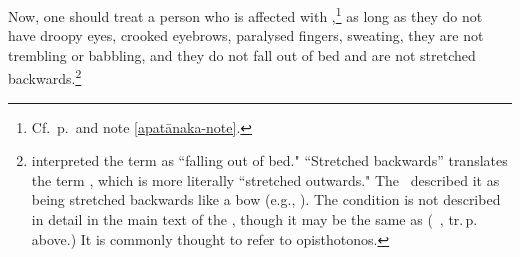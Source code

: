 \begin{translation}
Now, one should treat a person who is affected with
,\footnote{Cf.\ p.\,\pageref{apatānaka} and note
    \ref{apatānaka-note}.} as long as they do not have droopy eyes, crooked
    eyebrows, paralysed fingers, sweating, they are not trembling or babbling,
    and they do not fall out of bed and are not stretched
    backwards.\footnote{\label{bahirāyāmin} interpreted
        the term  as “falling out of bed." “Stretched backwards”
        translates the  term , which is more literally “stretched
        outwards."  The \CS\ described it as being stretched backwards like a bow
        (e.g.,  ).  The condition is not described in detail
        in the main text of the \SS, though it may be the same as 
        (\SS\ , tr.\,p.\,\pageref{bāhyāyāma} above.) %
        It is commonly thought to refer to opisthotonos.}

\end{translation}
